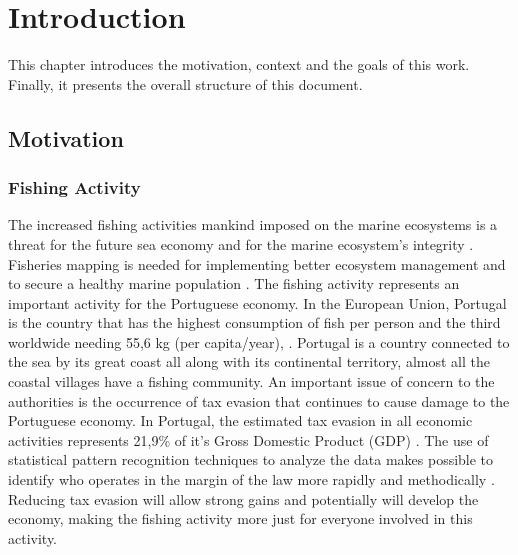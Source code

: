

% 
%  
%
\chapter{Introduction}
\label{cha:introduction}
This chapter introduces the motivation, context and the goals of this work. Finally, it presents the overall structure of this document.

\section{Motivation} %
\label{sec:motivation}

\subsection{Fishing Activity} %
\label{sub:fishing_activity}
The increased fishing activities mankind imposed on the marine ecosystems is a threat for the future sea economy and for the marine ecosystem’s integrity \cite{AgardyEffects}.\\
Fisheries mapping is needed for implementing better ecosystem management and to secure a healthy marine population \cite{AlfredImperative}.
The fishing activity represents an important activity for the Portuguese economy. In the European Union, Portugal is the country that has the highest consumption of fish per person and the third worldwide needing 55,6 kg (per capita/year), \cite{WEBSITE:ConsumoPescasPortugal}. Portugal is a country connected to the sea by its great coast all along with its continental territory, almost all the coastal villages have a fishing community.
An important issue of concern to the authorities is the occurrence of tax evasion that continues to cause damage to the Portuguese economy. In Portugal, the estimated tax evasion in all economic activities represents 21,9\% of it's Gross Domestic Product (GDP) \cite{BOOK:EsbocoFraude}.
The use of statistical pattern recognition techniques to analyze the data makes possible to identify who operates in the margin of the law more rapidly and methodically \cite{ShuklaBigData}. Reducing tax evasion will allow strong gains and potentially will develop the economy, making the fishing activity more just for everyone involved in this activity.

